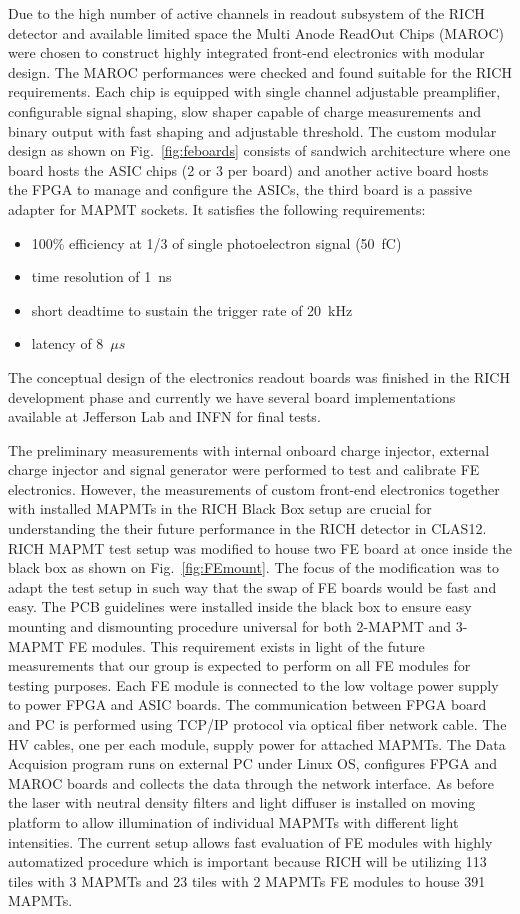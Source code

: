 Due to the high number of active channels in readout subsystem of the RICH detector and available limited space the Multi Anode ReadOut Chips (MAROC) were chosen to construct highly integrated front-end electronics with modular design.
The MAROC performances were checked and found suitable for the RICH requirements.
Each chip is equipped with single channel adjustable preamplifier, configurable signal shaping, slow shaper capable of charge measurements and binary output with fast shaping and adjustable threshold.
The custom modular design as shown on Fig.~\ref{fig:feboards} consists of sandwich architecture where one board hosts the ASIC chips (2 or 3 per board) and another active board hosts the FPGA to manage and configure the ASICs, the third board is a passive adapter for MAPMT sockets.
It satisfies the following requirements:
\begin{itemize}
\item 100\% efficiency at 1/3 of single photoelectron signal (50~fC)
\item time resolution of 1~ns
\item short deadtime to sustain the trigger rate of 20~kHz
\item latency of 8~$\mu s$
\end{itemize}
The conceptual design of the electronics readout boards was finished in the RICH development phase and currently we have several board implementations available at Jefferson Lab and INFN for final tests.

The preliminary measurements with internal onboard charge injector, external charge injector and signal generator were performed to test and calibrate FE electronics.
However, the measurements of custom front-end electronics together with installed MAPMTs in the RICH Black Box setup are crucial for understanding the their future performance in the RICH detector in CLAS12.
RICH MAPMT test setup was modified to house two FE board at once inside the black box as shown on Fig.~\ref{fig:FEmount}.
The focus of the modification was to adapt the test setup in such way that the swap of FE boards would be fast and easy.
The PCB guidelines were installed inside the black box to ensure easy mounting and dismounting procedure universal for both 2-MAPMT and 3-MAPMT FE modules.
This requirement exists in light of the future measurements that our group is expected to perform on all FE modules for testing purposes.
Each FE module is connected to the low voltage power supply to power FPGA and ASIC boards. The communication between FPGA board and PC is performed using TCP/IP protocol via optical fiber network cable.
The HV cables, one per each module, supply power for attached MAPMTs.
The Data Acquision program runs on external PC under Linux OS, configures FPGA and MAROC boards and collects the data through the network interface.
As before the laser with neutral density filters and light diffuser is installed on moving platform to allow illumination of individual MAPMTs with different light intensities.
The current setup allows fast evaluation of FE modules with highly automatized procedure which is important because RICH will be utilizing 113 tiles with 3 MAPMTs and 23 tiles with 2 MAPMTs FE modules to house 391 MAPMTs.

